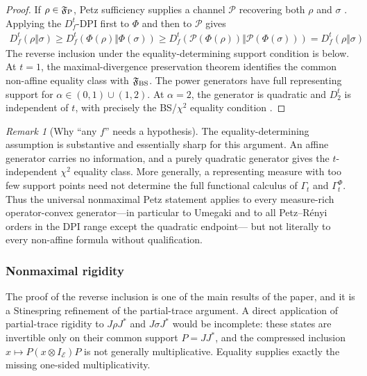 \documentclass[11pt]{article}
\theoremstyle{remark}
\newtheorem{remark}[remark]{Remark}
\newcommand{\1}{\mathbbm{1}}
\begin{document}
\begin{proof}
If $\rho\in\mathfrak F_{\rm P}$, Petz sufficiency supplies a channel
$\mathcal P$ recovering both $\rho$ and $\sigma$
\cite[Theorem~3.18(i),(iii),(viii)]{hiai2017different}.  Applying
the $D_f^t$-DPI first to $\Phi$ and then to $\mathcal P$ gives
\begin{equation}
 \begin{aligned}
  D_f^t(\rho\Vert\sigma)
  \geq D_f^t(\Phi(\rho)\Vert\Phi(\sigma))\geq D_f^t(\mathcal P(\Phi(\rho))\Vert
               \mathcal P(\Phi(\sigma)))
   =D_f^t(\rho\Vert\sigma)
 \end{aligned}
\end{equation}
The reverse inclusion under the equality-determining support
condition is
 below.  At $t=1$,
the maximal-divergence preservation theorem
\cite[Theorem~3.34]{hiai2017different} identifies the common
non-affine equality class with $\mathfrak F_{\rm BS}$.  The
power generators have full representing support for
$\alpha\in(0,1)\cup(1,2)$.  At $\alpha=2$, the generator is
quadratic and $D_2^t$ is independent of $t$, with precisely the
BS/$\chi^2$ equality condition
\cite[Example~4.2 and Theorem~3.34]{hiai2017different}.
\end{proof}

\begin{remark}[Why ``any $f$'' needs a hypothesis]
The equality-determining assumption is substantive and essentially
sharp for this argument.  An affine generator carries no information,
and a purely quadratic generator gives the $t$-independent
$\chi^2$ equality class.  More generally, a representing measure
with too few support points need not determine the full functional
calculus of $\Gamma_t$ and $\Gamma_t^\Phi$.  Thus the universal
nonmaximal Petz statement applies to every measure-rich
operator-convex generator---in particular to Umegaki and to all
Petz--R\'enyi orders in the DPI range except the quadratic endpoint---
but not literally to every non-affine formula without qualification.
\end{remark}

\subsubsection{Nonmaximal rigidity}

The proof of the reverse inclusion is one of the main results of the paper, and it is a Stinespring refinement of the
partial-trace argument.  A direct application of partial-trace
rigidity to $J\rho J^*$ and $J\sigma J^*$ would be incomplete:
these states are invertible only on their common support $P=JJ^*$, and the compressed
inclusion $x\mapsto P(x\otimes I_{\mathcal E})P$ is not generally
multiplicative.  Equality supplies exactly the missing one-sided
multiplicativity.
\end{document}
